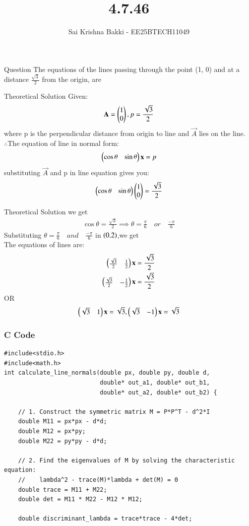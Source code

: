 \documentclass{beamer}
\title %
{4.7.46}
\date{}
\author %
{Sai Krishna Bakki - EE25BTECH11049}
\begin{document}
\frame{\titlepage}
\begin{frame}{Question}
The equations of the lines passing through the point (1, 0) and at a distance $\frac{\sqrt{3}}{2}$ from the origin, are
\end{frame}
\begin{frame}{Theoretical Solution}
   Given:
\begin{align}
    \mathbf{A}=\begin{pmatrix}1\\0\end{pmatrix},p=\frac{\sqrt{3}}{2}
\end{align}
where p is the perpendicular distance from origin to line and $\vec{A}$ lies on the line.\\
$\therefore$The equation of line in normal form:
\begin{align}
    \begin{pmatrix}\cos\theta & \sin\theta\end{pmatrix}\mathbf{x}=p
\end{align}
substituting $\vec{A}$ and p in line equation gives you:
\begin{align}
    \begin{pmatrix}\cos\theta & \sin\theta\end{pmatrix}\begin{pmatrix}1\\0\end{pmatrix}=\frac{\sqrt{3}}{2}\\
\end{align}
\end{frame}
\begin{frame}{Theoretical Solution}
we get
\begin{align}
    \cos\theta=\frac{\sqrt{3}}{2}\implies \theta=\frac{\pi}{6}\quad or \quad \frac{-\pi}{6}
\end{align}
Substituting $\theta=\frac{\pi}{6}\quad and \quad \frac{-\pi}{6}$ in $\left(0.2\right)$,we get\\
The equations of lines are:
\begin{align}
    \begin{pmatrix}\frac{\sqrt{3}}{2} & \frac{1}{2}\end{pmatrix}\mathbf{x}=\frac{\sqrt{3}}{2}\\
    \begin{pmatrix}\frac{\sqrt{3}}{2} & -\frac{1}{2}\end{pmatrix}\mathbf{x}=\frac{\sqrt{3}}{2}
\end{align}
OR
\begin{align}
 \begin{pmatrix}\sqrt{3} & 1\end{pmatrix}\mathbf{x}=\sqrt{3},
    \begin{pmatrix}\sqrt{3} & -1\end{pmatrix}\mathbf{x}=\sqrt{3}   
\end{align}
\end{frame}
\begin{frame}[fragile]
\frametitle{C Code}
\begin{lstlisting}
#include<stdio.h>
#include<math.h>
int calculate_line_normals(double px, double py, double d,
                           double* out_a1, double* out_b1,
                           double* out_a2, double* out_b2) {

    // 1. Construct the symmetric matrix M = P*P^T - d^2*I
    double M11 = px*px - d*d;
    double M12 = px*py;
    double M22 = py*py - d*d;

    // 2. Find the eigenvalues of M by solving the characteristic equation:
    //    lambda^2 - trace(M)*lambda + det(M) = 0
    double trace = M11 + M22;
    double det = M11 * M22 - M12 * M12;

    double discriminant_lambda = trace*trace - 4*det;
\end{lstlisting}    
\end{frame}
\end{document}
